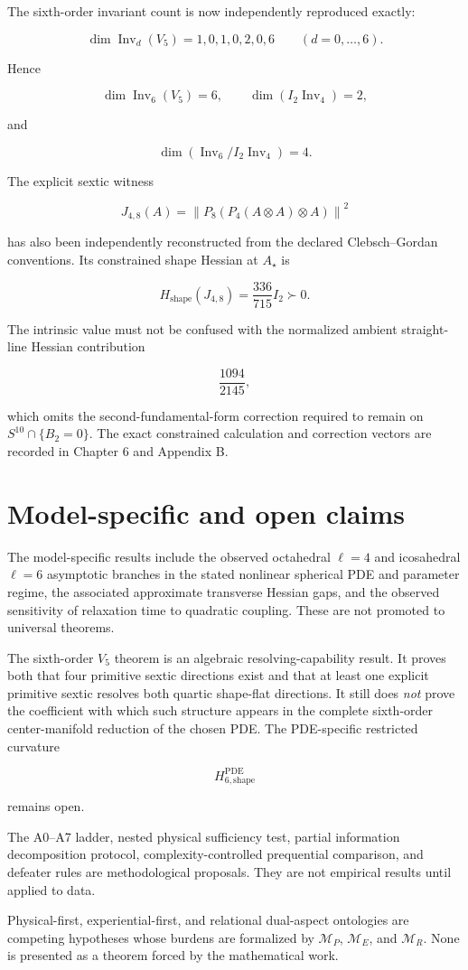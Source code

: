 The sixth-order invariant count is now independently reproduced exactly:

\[
\dim\operatorname{Inv}_d(V_5)=1,0,1,0,2,0,6
\qquad(d=0,\ldots,6).
\]

Hence

\[
\dim\operatorname{Inv}_6(V_5)=6,
\qquad
\dim(I_2\operatorname{Inv}_4)=2,
\]

and

\[
\dim\left(\operatorname{Inv}_6/I_2\operatorname{Inv}_4\right)=4.
\]

The explicit sextic witness

\[
J_{4,8}(A)=\left\|P_8\left(P_4(A\otimes A)\otimes A\right)\right\|^2
\]

has also been independently reconstructed from the declared Clebsch--Gordan conventions. Its constrained shape Hessian at $A_\star$ is

\[
H_{\mathrm{shape}}(J_{4,8})=\frac{336}{715}I_2\succ0.
\]

The intrinsic value must not be confused with the normalized ambient straight-line Hessian contribution

\[
\frac{1094}{2145},
\]

which omits the second-fundamental-form correction required to remain on $S^{10}\cap\{B_2=0\}$. The exact constrained calculation and correction vectors are recorded in Chapter 6 and Appendix B.

\section*{Model-specific and open claims}

The model-specific results include the observed octahedral $\ell=4$ and icosahedral $\ell=6$ asymptotic branches in the stated nonlinear spherical PDE and parameter regime, the associated approximate transverse Hessian gaps, and the observed sensitivity of relaxation time to quadratic coupling. These are not promoted to universal theorems.

The sixth-order $V_5$ theorem is an algebraic resolving-capability result. It proves both that four primitive sextic directions exist and that at least one explicit primitive sextic resolves both quartic shape-flat directions. It still does \emph{not} prove the coefficient with which such structure appears in the complete sixth-order center-manifold reduction of the chosen PDE. The PDE-specific restricted curvature

\[
H_{6,\mathrm{shape}}^{\mathrm{PDE}}
\]

remains open.

The A0--A7 ladder, nested physical sufficiency test, partial information decomposition protocol, complexity-controlled prequential comparison, and defeater rules are methodological proposals. They are not empirical results until applied to data.

Physical-first, experiential-first, and relational dual-aspect ontologies are competing hypotheses whose burdens are formalized by $\mathcal M_P$, $\mathcal M_E$, and $\mathcal M_R$. None is presented as a theorem forced by the mathematical work.

